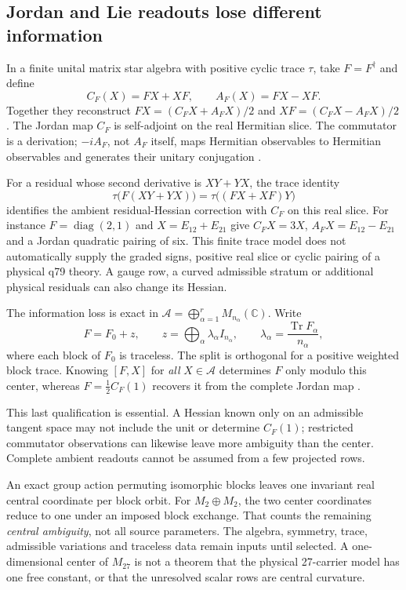 \documentclass[11pt,a4paper]{article}
\begin{document}
\subsection{Jordan and Lie readouts lose different information}
\label{sec:jordan-lie-center}
In a finite unital matrix star algebra with positive cyclic trace
\(\tau\), take \(F=F^\dagger\) and define
\[
 C_F(X)=FX+XF,\qquad A_F(X)=FX-XF.
\]
Together they reconstruct \(FX=(C_FX+A_FX)/2\) and
\(XF=(C_FX-A_FX)/2\). The Jordan map \(C_F\) is self-adjoint on
the real Hermitian slice. The commutator is a derivation; \(-iA_F\),
not \(A_F\) itself, maps Hermitian observables to Hermitian observables
and generates their unitary conjugation \cite{PreprojectionJordanLie2026}.

For a residual whose second derivative is \(XY+YX\), the trace identity
\[
 \tau\bigl(F(XY+YX)\bigr)=\tau\bigl((FX+XF)Y\bigr)
\]
identifies the ambient residual-Hessian correction with \(C_F\) on
this real slice. For instance \(F=\operatorname{diag}(2,1)\) and
\(X=E_{12}+E_{21}\) give \(C_FX=3X\),
\(A_FX=E_{12}-E_{21}\) and a Jordan quadratic pairing of six.
This finite trace model does not automatically supply the graded signs,
positive real slice or cyclic pairing of a physical q79 theory. A gauge
row, a curved admissible stratum or additional physical residuals can
also change its Hessian.

The information loss is exact in
\(\mathcal A=\bigoplus_{\alpha=1}^r M_{n_\alpha}(\mathbb C)\).
Write
\[
 F=F_0+z,\qquad z=\bigoplus_\alpha\lambda_\alpha I_{n_\alpha},
 \qquad\lambda_\alpha=\frac{\operatorname{Tr}F_\alpha}{n_\alpha},
\]
where each block of \(F_0\) is traceless. The split is orthogonal for
a positive weighted block trace. Knowing \([F,X]\) for \emph{all}
\(X\in\mathcal A\) determines \(F\) only modulo this center, whereas
\(F=\frac12 C_F(1)\) recovers it from the complete Jordan map
\cite{PreprojectionCentralCurvature2026}.

This last qualification is essential. A Hessian known only on an
admissible tangent space may not include the unit or determine \(C_F(1)\);
restricted commutator observations can likewise leave more ambiguity
than the center. Complete ambient readouts cannot be assumed from a
few projected rows.

An exact group action permuting isomorphic blocks leaves one invariant
real central coordinate per block orbit. For \(M_2\oplus M_2\), the
two center coordinates reduce to one under an imposed block exchange.
That counts the remaining \emph{central ambiguity}, not all source
parameters. The algebra, symmetry, trace, admissible variations and
traceless data remain inputs until selected. A one-dimensional center of
\(M_{27}\) is not a theorem that the physical 27-carrier model has one
free constant, or that the unresolved scalar rows are central curvature.
\end{document}
